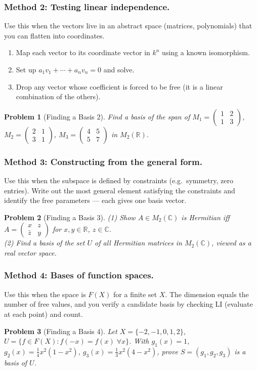 \documentclass{article}
\newtheorem{problem}{Problem}
\begin{document}
\subsubsection*{Method 2: Testing linear independence.}
Use this when the vectors live in an abstract space (matrices, polynomials) that you can flatten into coordinates.
\begin{enumerate}
    \item Map each vector to its coordinate vector in $k^n$ using a known isomorphism.
    \item Set up $a_1v_1+\cdots+a_nv_n=0$ and solve.
    \item Drop any vector whose coefficient is forced to be free (it is a linear combination of the others).
\end{enumerate}
\begin{problem}[Finding a Basis 2]
    Find a basis of the span of $M_1=\begin{pmatrix}1&2\\1&3\end{pmatrix}$, $M_2=\begin{pmatrix}2&1\\3&1\end{pmatrix}$, $M_3=\begin{pmatrix}4&5\\5&7\end{pmatrix}$ in $M_2(\mathbb{R})$.
\end{problem}
\subsubsection*{Method 3: Constructing from the general form.}
Use this when the subspace is defined by constraints (e.g.\ symmetry, zero entries). Write out the most general element satisfying the constraints and identify the free parameters --- each gives one basis vector.
\begin{problem}[Finding a Basis 3]
    (1) Show $A\in M_2(\mathbb{C})$ is Hermitian iff $A=\begin{pmatrix}x&z\\\bar{z}&y\end{pmatrix}$ for $x,y\in\mathbb{R}$, $z\in\mathbb{C}$.\\
    (2) Find a basis of the set $U$ of all Hermitian matrices in $M_2(\mathbb{C})$, viewed as a real vector space.
\end{problem}
\subsubsection*{Method 4: Bases of function spaces.}
Use this when the space is $F(X)$ for a finite set $X$. The dimension equals the number of free values, and you verify a candidate basis by checking LI (evaluate at each point) and count.
\begin{problem}[Finding a Basis 4]
    Let $X=\{-2,-1,0,1,2\}$, $U=\{f\in F(X):f(-x)=f(x)\;\forall x\}$. With $g_1(x)=1$, $g_2(x)=\frac{1}{4}x^2(1-x^2)$, $g_3(x)=\frac{1}{3}x^2(4-x^2)$, prove $S=(g_1,g_2,g_3)$ is a basis of $U$.
\end{problem}
\end{document}
